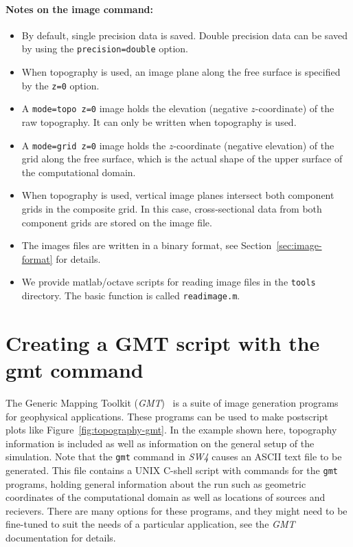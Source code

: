 \documentclass[11pt]{report}
\begin{document}
\paragraph{Notes on the image command:}
\begin{itemize}
\item By default, single precision data is saved. Double precision data can be saved by
  using the {\tt precision=double} option.
\item When topography is used, an image plane along the free surface is specified by the {\tt z=0} option.
\item A {\tt mode=topo z=0} image holds the elevation (negative $z$-coordinate) of the raw
  topography. It can only be written when topography is used.
\item A {\tt mode=grid z=0} image holds the $z$-coordinate (negative elevation) of the grid along
  the free surface, which is the actual shape of the upper surface of the computational domain.
\item When topography is used, vertical image planes intersect both component
grids in the composite grid. In this case, cross-sectional data from both component grids are stored
on the image file.
\item The images files are written in a binary format, see Section~\ref{sec:image-format} for
  details.
\item We provide matlab/octave scripts for reading image files in the {\tt tools} directory. The
  basic function is called {\tt readimage.m}. 
\end{itemize}

\section{Creating a GMT script with the gmt command}\label{sec:gmt}
The Generic Mapping Toolkit (\emph{GMT})~\cite{WesselSmithGMT} is a suite of image generation
programs for geophysical applications. These programs can be used to make postscript plots like
Figure~\ref{fig:topography-gmt}. In the example shown here, topography information is included as
well as information on the general setup of the simulation. Note that the {\tt gmt} command in
\emph{SW4} causes an ASCII text file to be generated. This file contains a UNIX C-shell script with
commands for the \verb+gmt+ programs, holding general information about the run such as geometric
coordinates of the computational domain as well as locations of sources and recievers. There are
many options for these programs, and they might need to be fine-tuned to suit the needs of a particular
application, see the \emph{GMT} documentation for details. 
\end{document}
